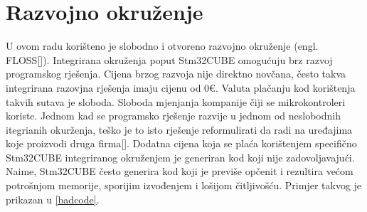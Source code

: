 \documentclass[times, utf8, diplomski]{diplomski}
\begin{document}
\newpage

\section{Razvojno okruženje}
U ovom radu korišteno je slobodno i otvoreno razvojno okruženje (engl. FLOSS[\cite{FLOSS}]). Integrirana okruženja poput Stm32CUBE omogućuju brz razvoj programskog rješenja. Cijena brzog razvoja nije direktno novčana, često takva integrirana razovjna rješenja imaju cijenu od 0€. Valuta plačanju kod korištenja takvih sutava je sloboda. Sloboda mjenjanja kompanije čiji se mikrokontroleri koriste. Jednom kad se programsko rješenje razvije u jednom od neslobodnih itegrianih okurženja, teško je to isto rješenje reformulirati da radi na uređajima koje proizvodi druga firma[\cite{VENDORLOCKIN}]. Dodatna cijena koja se plaća korištenjem specifično Stm32CUBE integriranog okruženjem je generiran kod koji nije zadovoljavajući. Naime, Stm32CUBE često generira kod koji je previše opčenit i rezultira većom potrošnjom memorije, sporijim izvođenjem i lošijom čitljivošću. Primjer takvog je prikazan u \ref{badcode}.
\end{document}

